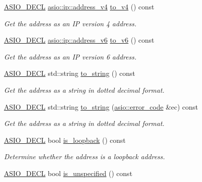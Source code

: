 \begin{DoxyCompactItemize}
\hyperlink{config_8hpp_ab54d01ea04afeb9a8b39cfac467656b7}{A\+S\+I\+O\+\_\+\+D\+E\+C\+L} \hyperlink{classasio_1_1ip_1_1address__v4}{asio\+::ip\+::address\+\_\+v4} \hyperlink{classasio_1_1ip_1_1address_a66edd329a739ce51a67e25dab61123f3}{to\+\_\+v4} () const 
\begin{DoxyCompactList}\small\item\em Get the address as an I\+P version 4 address. \end{DoxyCompactList}\item 
\hyperlink{config_8hpp_ab54d01ea04afeb9a8b39cfac467656b7}{A\+S\+I\+O\+\_\+\+D\+E\+C\+L} \hyperlink{classasio_1_1ip_1_1address__v6}{asio\+::ip\+::address\+\_\+v6} \hyperlink{classasio_1_1ip_1_1address_a14cfe1b19f84f2894aa434254592220a}{to\+\_\+v6} () const 
\begin{DoxyCompactList}\small\item\em Get the address as an I\+P version 6 address. \end{DoxyCompactList}\item 
\hyperlink{config_8hpp_ab54d01ea04afeb9a8b39cfac467656b7}{A\+S\+I\+O\+\_\+\+D\+E\+C\+L} std\+::string \hyperlink{classasio_1_1ip_1_1address_aa0720733825baed4a6aa3cc6b426e052}{to\+\_\+string} () const 
\begin{DoxyCompactList}\small\item\em Get the address as a string in dotted decimal format. \end{DoxyCompactList}\item 
\hyperlink{config_8hpp_ab54d01ea04afeb9a8b39cfac467656b7}{A\+S\+I\+O\+\_\+\+D\+E\+C\+L} std\+::string \hyperlink{classasio_1_1ip_1_1address_a247cc885a0374fc2f5933c81895a445d}{to\+\_\+string} (\hyperlink{classasio_1_1error__code}{asio\+::error\+\_\+code} \&ec) const 
\begin{DoxyCompactList}\small\item\em Get the address as a string in dotted decimal format. \end{DoxyCompactList}\item 
\hyperlink{config_8hpp_ab54d01ea04afeb9a8b39cfac467656b7}{A\+S\+I\+O\+\_\+\+D\+E\+C\+L} bool \hyperlink{classasio_1_1ip_1_1address_ab224a5b0c4a0555b7a2e0509f57caffe}{is\+\_\+loopback} () const 
\begin{DoxyCompactList}\small\item\em Determine whether the address is a loopback address. \end{DoxyCompactList}\item 
\hyperlink{config_8hpp_ab54d01ea04afeb9a8b39cfac467656b7}{A\+S\+I\+O\+\_\+\+D\+E\+C\+L} bool \hyperlink{classasio_1_1ip_1_1address_aaef1f6b1a9d8efae24f885aed6290ffa}{is\+\_\+unspecified} () const 

\end{DoxyCompactItemize}
